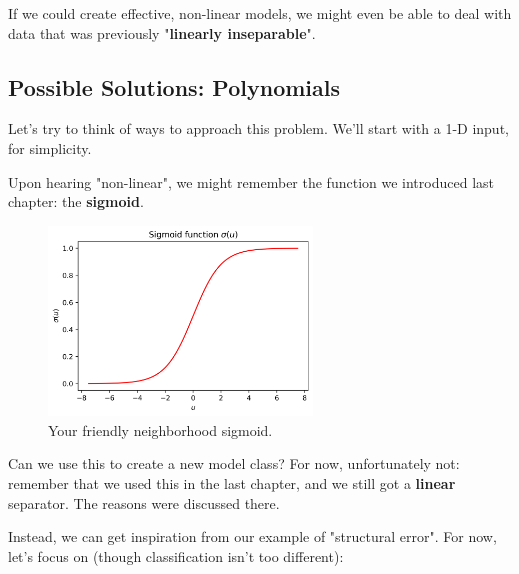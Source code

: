         If we could create effective, non-linear models, we might even be able to deal with data that was previously "\textbf{linearly inseparable}".

    \subsecdiv

    \subsection*{Possible Solutions: Polynomials}

        Let's try to think of ways to approach this problem. We'll start with a 1-D input, for simplicity.

        Upon hearing "non-linear", we might remember the function we introduced last chapter: the \textbf{sigmoid}.
    
        \begin{figure}[H]
            \centering
            
            \includegraphics[width=70mm,scale=0.5]{images/feature_images/sigmoid_u.png}
            \caption*{Your friendly neighborhood sigmoid.}
        \end{figure}
    
        Can we use this to create a new model class? For now, unfortunately not: remember that we used this in the last chapter, and we still got a \textbf{linear} separator. The reasons were discussed there.
    
        Instead, we can get inspiration from our example of "structural error". For now, let's focus on  (though classification isn't too different):
    
